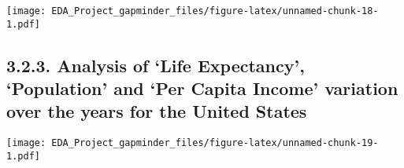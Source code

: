 \documentclass[]{article}
\newenvironment{Shaded}{\begin{snugshade}}{\end{snugshade}}
\newcommand{\KeywordTok}[1]{\textcolor[rgb]{0.13,0.29,0.53}{\textbf{#1}}}
\newcommand{\DataTypeTok}[1]{\textcolor[rgb]{0.13,0.29,0.53}{#1}}
\newcommand{\DecValTok}[1]{\textcolor[rgb]{0.00,0.00,0.81}{#1}}
\newcommand{\StringTok}[1]{\textcolor[rgb]{0.31,0.60,0.02}{#1}}
\newcommand{\OperatorTok}[1]{\textcolor[rgb]{0.81,0.36,0.00}{\textbf{#1}}}
\newcommand{\NormalTok}[1]{#1}
\begin{document}
\begin{Shaded}
\end{Shaded}

\texttt{[image: EDA\_Project\_gapminder\_files/figure-latex/unnamed-chunk-18-1.pdf]}

\subsection{\texorpdfstring{3.2.3. Analysis of `Life Expectancy',
`Population' and `Per Capita Income' variation over the years for the
United
States}{3.2.3. Analysis of Life Expectancy, Population and Per Capita Income variation over the years for the United States}}\label{analysis-of-life-expectancy-population-and-per-capita-income-variation-over-the-years-for-the-united-states}

\begin{Shaded}
\end{Shaded}

\texttt{[image: EDA\_Project\_gapminder\_files/figure-latex/unnamed-chunk-19-1.pdf]}
\end{document}

